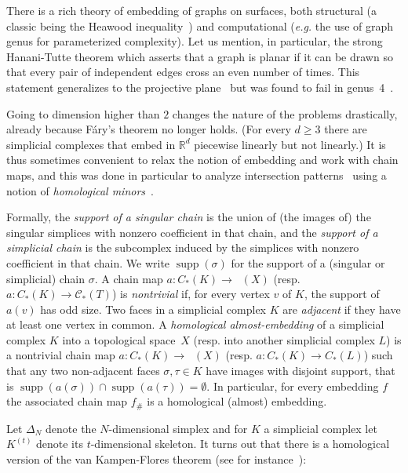 \documentclass[a4paper,UKenglish,thm-restate]{article}
\newcommand{\R}{\mathbb{R}}
\newcommand{\C}{\mathcal{C}}
\DeclareMathOperator{\supp}{supp}
\DeclareMathOperator{\Csing}{C_*^{sing}}
\newcommand{\defn}[1]{\emph{\color{violet}#1}}
\begin{document}
There is a rich theory of embedding of graphs on surfaces, both structural (a classic being the Heawood inequality~\cite{ringel2012map}) and computational (\emph{e.g.} the use of graph genus for parameterized complexity). Let us mention, in particular, the strong Hanani-Tutte theorem which asserts that a graph is planar if it can be drawn so that every pair of independent edges cross an even number of times. This statement generalizes to the projective plane~\cite{pelsmajer2009strong,de2017direct} but was found to fail in genus~4~\cite{fulek2019counterexample}. 

\medskip

Going to dimension higher than $2$ changes the nature of the problems drastically, already because Fáry's theorem no longer holds. (For every $d \ge 3$ there are simplicial complexes that embed in $\R^d$ piecewise linearly but not linearly.) It is thus sometimes convenient to relax the notion of embedding and work with chain maps, and this was done in particular to analyze intersection patterns~\cite{hellyBetti,patakova2022bounding,steppingUp} using a notion of \emph{homological minors}~\cite{wagner2012minors}.

\medskip

Formally, the \defn{support of a singular chain} is the union of (the images of) the singular simplices with nonzero coefficient in that chain, and the  \defn{support of a simplicial chain} is the subcomplex induced by the simplices with nonzero coefficient in that chain.  We write $\supp(\sigma)$ for the support of a (singular or simplicial) chain $\sigma$. A chain map $a:C_*(K)\to \Csing(X)$ (resp. $a:C_*(K)\to \C_*(T)$) is \defn{nontrivial} if, for every vertex $v$ of $K$, the support of $a(v)$ has odd size. Two faces in a simplicial complex $K$ are \defn{adjacent} if they have at least one vertex in common.  A \defn{homological almost-embedding} of a simplicial complex $K$ into a topological space~$X$ (resp. into another simplicial complex $L$) is a nontrivial chain map $a:C_*(K)\to \Csing(X)$ (resp. $a:C_*(K)\to C_*(L)$) such that any two non-adjacent faces $\sigma,\tau \in K$ have images with disjoint support, that is $\supp(a(\sigma)) \cap \supp(a(\tau)) = \emptyset$. In particular, for every embedding $f$ the associated chain map $f_\#$ is a homological (almost) embedding.

\medskip

Let $\Delta_N$ denote the $N$-dimensional simplex and for $K$ a simplicial complex let $K^{(t)}$ denote its $t$-dimensional skeleton. It turns out that there is a homological version of the van Kampen-Flores theorem (see for instance~\cite[Corollary~14]{hellyBetti}):
\end{document}
